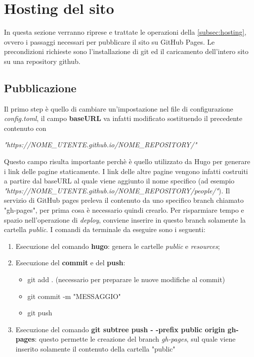 \documentclass[target=bach,aauheader=]{thud}
\begin{document}
\section{Hosting del sito}
In questa sezione verranno riprese e trattate le operazioni della \cref{subsec:hosting}, ovvero i passaggi necessari per pubblicare il sito su GitHub Pages. 
Le precondizioni richieste sono l'installazione di git ed il caricamento dell'intero sito su una repository github. 

\subsection{Pubblicazione}
Il primo step è quello di cambiare un'impostazione nel file di configurazione \textit{config.toml}, il campo \textbf{baseURL} va infatti modificato sostituendo il precedente contenuto con
\begin{center}
    \textit{"https://NOME\_UTENTE.github.io/NOME\_REPOSITORY/"}
\end{center}
Questo campo risulta importante perchè è quello utilizzato da Hugo per generare i link delle pagine staticamente. I link delle altre pagine vengono infatti costruiti a partire dal baseURL al quale viene aggiunto il nome specifico (ad esempio \textit{"https://NOME\_UTENTE.github.io/NOME\_REPOSITORY/people/"}).
\newline
Il servizio di GitHub pages preleva il contenuto da uno specifico branch chiamato "gh-pages", per prima cosa è necessario quindi crearlo. Per risparmiare tempo e spazio nell'operazione di \textit{deploy}, conviene inserire in questo branch solamente la cartella \textit{public}. 
I comandi da terminale da eseguire sono i seguenti:
\begin{enumerate}
    \item Esecuzione del comando \textbf{hugo}: genera le cartelle \textit{public} e \textit{resources};
    \item Esecuzione del \textbf{commit} e del \textbf{push}:
    \begin{itemize}
        \item git add . (necessario per preparare le nuove modifiche al commit)
        \item git commit -m "MESSAGGIO"
        \item git push
    \end{itemize}
    \item Esecuzione del comando \textbf{git subtree push - -prefix public origin gh-pages}: questo permette le creazione del branch \textit{gh-pages}, sul quale viene inserito solamente il contenuto della cartella "public" 
\end{enumerate}
\end{document}
